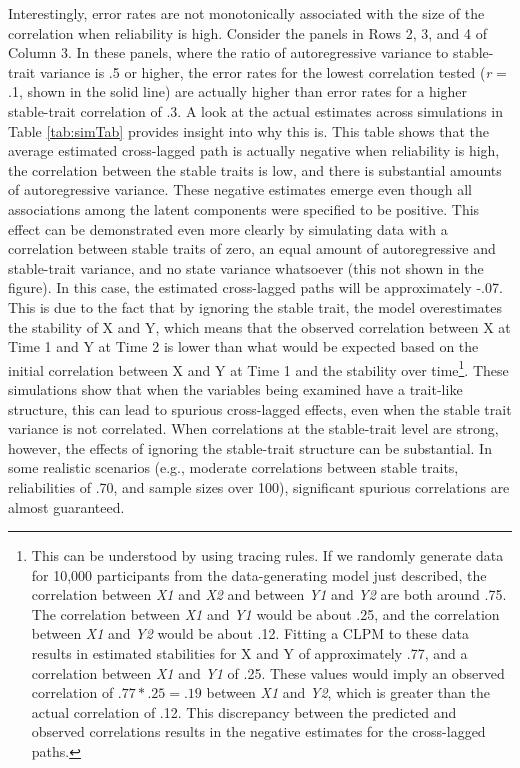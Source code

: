 \documentclass[
  english,
  man,floatsintext]{apa6}
\begin{document}
Interestingly, error rates are not monotonically associated with the size of the correlation when reliability is high. Consider the panels in Rows 2, 3, and 4 of Column 3. In these panels, where the ratio of autoregressive variance to stable-trait variance is .5 or higher, the error rates for the lowest correlation tested (\emph{r} = .1, shown in the solid line) are actually higher than error rates for a higher stable-trait correlation of .3. A look at the actual estimates across simulations in Table \ref{tab:simTab} provides insight into why this is. This table shows that the average estimated cross-lagged path is actually negative when reliability is high, the correlation between the stable traits is low, and there is substantial amounts of autoregressive variance. These negative estimates emerge even though all associations among the latent components were specified to be positive. This effect can be demonstrated even more clearly by simulating data with a correlation between stable traits of zero, an equal amount of autoregressive and stable-trait variance, and no state variance whatsoever (this not shown in the figure). In this case, the estimated cross-lagged paths will be approximately -.07. This is due to the fact that by ignoring the stable trait, the model overestimates the stability of X and Y, which means that the observed correlation between X at Time 1 and Y at Time 2 is lower than what would be expected based on the initial correlation between X and Y at Time 1 and the stability over time\footnote{This can be understood by using tracing rules. If we randomly generate data for 10,000 participants from the data-generating model just described, the correlation between \emph{X1} and \emph{X2} and between \emph{Y1} and \emph{Y2} are both around .75. The correlation between \emph{X1} and \emph{Y1} would be about .25, and the correlation between \emph{X1} and \emph{Y2} would be about .12. Fitting a CLPM to these data results in estimated stabilities for X and Y of approximately .77, and a correlation between \emph{X1} and \emph{Y1} of .25. These values would imply an observed correlation of \(.77 * .25 = .19\) between \emph{X1} and \emph{Y2}, which is greater than the actual correlation of .12. This discrepancy between the predicted and observed correlations results in the negative estimates for the cross-lagged paths.}. These simulations show that when the variables being examined have a trait-like structure, this can lead to spurious cross-lagged effects, even when the stable trait variance is not correlated. When correlations at the stable-trait level are strong, however, the effects of ignoring the stable-trait structure can be substantial. In some realistic scenarios (e.g., moderate correlations between stable traits, reliabilities of .70, and sample sizes over 100), significant spurious correlations are almost guaranteed.
\end{document}
